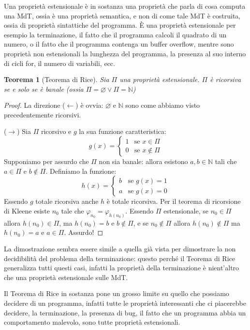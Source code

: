 \documentclass[a4paper,titlepage]{article}
\newtheorem{theorem}{Teorema}[section]
\theoremstyle{definition}
\newcommand{\N}{\mathbb{N}}
\begin{document}
Una proprietà estensionale è in sostanza una proprietà che parla di cosa computa una MdT, ossia è una proprietà semantica, e non di come tale MdT è costruita, ossia di proprietà sintattiche del programma. È una proprietà estensionale per esempio la terminazione, il fatto che il programma calcoli il quadrato di un numero, o il fatto che il programma contenga un buffer overflow, mentre sono proprietà non estensionali la lunghezza del programma, la presenza al suo interno di cicli for, il numero di variabili, ecc. 

\begin{theorem}[Teorema di Rice]
	Sia $\Pi$ una proprietà estensionale. $\Pi$ è ricorsiva se e solo se è banale (ossia $\Pi=\varnothing\lor\Pi=\N$)
\end{theorem}

\begin{proof}
	La direzione ($\leftarrow$) è ovvia: $\varnothing$ e $\N$ sono come abbiamo visto precedentemente ricorsivi. 
	
	($\rightarrow$) Sia $\Pi$ ricorsivo e $g$ la sua funzione caratteristica:
	\[		
		g(x)= 
		\begin{cases}
			1 & \text{se } x\in\Pi\\
			0 & \text{se } x\notin\Pi
		\end{cases}
	\]
	Supponiamo per assurdo che $\Pi$ non sia banale: allora esistono $a,b\in\N$ tali che $a\in\Pi$ e $b\notin\Pi$. Definiamo la funzione:
	\[		
		h(x)= 
		\begin{cases}
			b & \text{se } g(x) = 1\\
			a & \text{se } g(x) = 0
		\end{cases}
	\]
	Essendo $g$ totale ricorsiva anche $h$ è totale ricorsiva. Per il teorema di ricorsione di Kleene esiste $n_0$ tale che $\varphi_{n_0}=\varphi_{h(n_0)}$. Essendo $\Pi$ estensionale, se $n_0\in\Pi$ allora $h(n_0)\in\Pi$, ma $h(n_0) = b$ e $b\notin\Pi$, e se $n_0\notin\Pi$ allora $h(n_0)\notin\Pi$ ma $h(n_0)=a$ e $a\in\Pi$. Assurdo!
\end{proof}

La dimostrazione sembra essere simile a quella già vista per dimostrare la non decidibilità del problema della terminazione: questo perché il Teorema di Rice generalizza tutti questi casi, infatti la proprietà della terminazione è nient'altro che una proprietà estensionale sulle MdT. 

Il Teorema di Rice in sostanza pone un grosso limite su quello che possiamo decidere di un programma, infatti tutte le proprietà interessanti che ci piacerebbe decidere, la terminazione, la presenza di bug, il fatto che un programma abbia un comportamento malevolo, sono tutte proprietà estensionali. 
\end{document}
